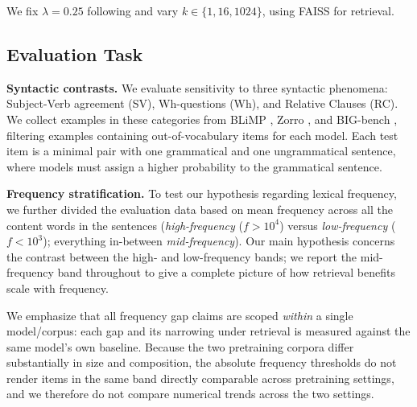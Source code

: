 \noindent We fix $\lambda=0.25$ following \citet{khandelwal2020knnlm} and vary $k \in \{1, 16, 1024\}$, using FAISS \citep{johnson2019billion} for retrieval.



\subsection{Evaluation Task}

\textbf{Syntactic contrasts.} We evaluate sensitivity to three syntactic phenomena: Subject-Verb agreement (SV), Wh-questions (Wh), and Relative Clauses (RC). We collect examples in these categories from BLiMP \citep{warstadt2020blimp}, Zorro \citep{huebner2021babyberta}, and BIG-bench \citep{srivastava2023beyond}, filtering examples containing out-of-vocabulary items for each model. Each test item is a minimal pair with one grammatical and one ungrammatical sentence, where models must assign a higher probability to the grammatical sentence. 


\noindent \textbf{Frequency stratification.} To test our hypothesis regarding lexical frequency, we further divided the evaluation data based on mean frequency across all the content words in the sentences (\textit{high-frequency} ($f > 10^4$) versus \textit{low-frequency} ($f < 10^3$); everything in-between \textit{mid-frequency}). Our main hypothesis concerns the contrast between the high- and low-frequency bands; we report the mid-frequency band throughout to give a complete picture of how retrieval benefits scale with frequency.

\noindent We emphasize that all frequency gap claims are scoped \emph{within} a single model/corpus: each gap and its narrowing under retrieval is measured against the same model's own baseline. Because the two pretraining corpora differ substantially in size and composition, the absolute frequency thresholds do not render items in the same band directly comparable across pretraining settings, and we therefore do not compare numerical trends across the two settings.

